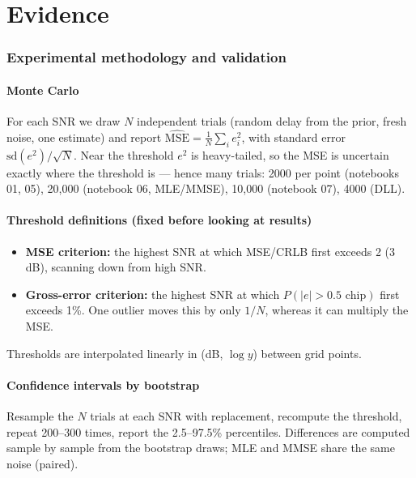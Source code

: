 \documentclass[11pt,a4paper]{article}
\begin{document}
\part{Evidence}
\section{Experimental methodology and validation}\label{sec:method}
\subsection{Monte Carlo}
For each SNR we draw $N$ independent trials (random delay from the prior, fresh noise, one estimate) and report
$\widehat{\text{MSE}}=\frac1N\sum_ie_i^2$, with standard error $\mathrm{sd}(e^2)/\sqrt N$. Near the threshold $e^2$ is heavy-tailed,
so the MSE is uncertain exactly where the threshold is --- hence many trials: 2000 per point (notebooks 01, 05), 20{,}000
(notebook 06, MLE/MMSE), 10{,}000 (notebook 07), 4000 (DLL).

\subsection{Threshold definitions (fixed before looking at results)}
\begin{itemize}
\item \textbf{MSE criterion:} the highest SNR at which MSE/CRLB first exceeds 2 (3\,dB), scanning down from high SNR.
\item \textbf{Gross-error criterion:} the highest SNR at which $P(|e|>0.5\text{ chip})$ first exceeds 1\%. One outlier moves this by
only $1/N$, whereas it can multiply the MSE.
\end{itemize}
Thresholds are interpolated linearly in (dB, $\log y$) between grid points.

\subsection{Confidence intervals by bootstrap}
Resample the $N$ trials at each SNR with replacement, recompute the threshold, repeat 200--300 times, report the 2.5--97.5\%
percentiles. Differences are computed sample by sample from the bootstrap draws; MLE and MMSE share the same noise (paired).
\end{document}
